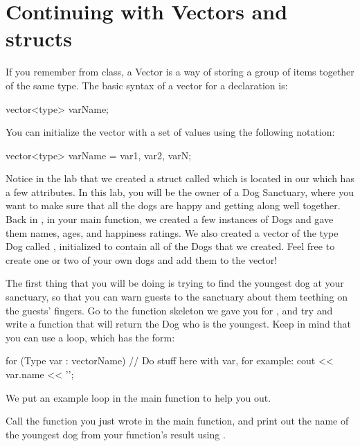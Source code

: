 \documentclass{tufte-handout}
\begin{document}
\section{Continuing with Vectors and structs}
If you remember from class, a Vector is a way of storing a group of items together of the same type.  The basic syntax of a vector for a declaration is:
\begin{Code}
vector<type> varName;
\end{Code}

You can initialize the vector with a set of values using the following notation:
\begin{Code}
vector<type> varName = {var1, var2, varN};
\end{Code}

Notice in the lab that we created a struct called  which is located in our  which has a few attributes.
In this lab, you will be the owner of a Dog Sanctuary, where you want to make sure that all the dogs are happy and getting along well together.
Back in , in your main function, we created a few instances of Dogs and gave them names, ages, and happiness ratings.
We also created a vector of the type Dog called , initialized to contain all of the Dogs that we created.
Feel free to create one or two of your own dogs and add them to the vector!


The first thing that you will be doing is trying to find the youngest dog at your sanctuary, so that you can warn guests to the sanctuary about them teething on the guests' fingers.  Go to the function skeleton we gave you for , and try and write a function that will return the Dog who is the youngest. Keep in mind that you can use a  loop, which has the form:
\begin{Code}
    for (Type var : vectorName) {
        // Do stuff here with var, for example:
        cout << var.name << '\n';
    }
\end{Code}

We put an example  loop in the main function to help you out.

Call the function you just wrote in the main function, and print out the name of the youngest dog from your function's result using .  
\end{document}
